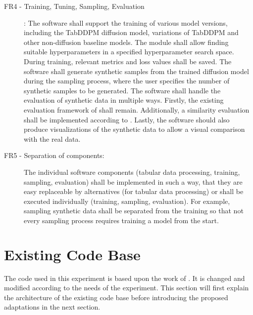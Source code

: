\begin{description}
		\item[FR4 - Training, Tuning, Sampling, Evaluation]:
		The software shall support the training of various model versions, including the TabDDPM diffusion model, variations of TabDDPM and other non-diffusion baseline models.
		The module shall allow finding suitable hyperparameters in a specified hyperparameter search space.
		During training, relevant metrics and loss values shall be saved.
		The software shall generate synthetic samples from the trained diffusion model during the sampling process, where the user specifies the number of synthetic samples to be generated.
		The software shall handle the evaluation of synthetic data in multiple ways.
		Firstly, the existing evaluation framework of \cite{kotelnikov2022TabDDPMModellingTabular} shall remain.
		Additionally, a similarity evaluation shall be implemented according to \cite{chundawat2022UniversalMetricRobust}.
		Lastly, the software should also produce visualizations of the synthetic data to allow a visual comparison with the real data.

	\item[FR5 - Separation of components:]
		The individual software components (tabular data processing, training, sampling, evaluation) shall be implemented in such a way,
		that they are easy replaceable by alternatives (for tabular data processing) or shall be executed individually (training, sampling, evaluation).
		For example, sampling synthetic data shall be separated from the training so that not every sampling process requires training a model from the start.
\end{description}


\section{Existing Code Base}
\label{ch:conceptualDesign-existingCodeBase}

The code \cite{akim2023TabDDPMModellingTabular} used in this experiment is based upon the work of \cite{kotelnikov2022TabDDPMModellingTabular}.
It is changed and modified according to the needs of the experiment.
This section will first explain the architecture of the existing code base before introducing the proposed adaptations in the next section.



